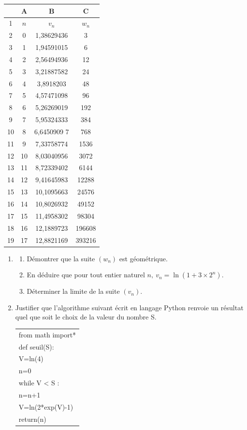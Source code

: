 \begin{minipage}{0.36\linewidth}
{\small\begin{tabular}{c |c|c|c}\hline
	&A &B &C\\ \hline
1 	&$n$&$v_n$& $w_n$\\ \hline
2&0 & 1,38629436 &3\\ \hline
3& 1& 1,94591015 &6\\ \hline
4& 2& 2,56494936 &12\\ \hline
5& 3& 3,21887582 &24\\ \hline
6& 4& 3,8918203 &48\\ \hline
7& 5& 4,57471098 &96\\ \hline
8& 6& 5,26269019 &192\\ \hline
9& 7& 5,95324333 &384\\ \hline
10& 8& 6,6450909 7 &768\\ \hline
11& 9& 7,33758774 &1536\\ \hline
12& 10& 8,03040956 &3072\\ \hline
13& 11& 8,72339402 &6144\\ \hline
14& 12& 9,41645983 &12288\\ \hline
15& 13& 10,1095663 &24576\\ \hline
16& 14& 10,8026932 &49152\\ \hline
17& 15& 11,4958302&98304\\ \hline
18& 16& 12,1889723&196608\\ \hline
19& 17&12,8821169& 393216\\ \hline
\end{tabular}}
\end{minipage}

\begin{enumerate}[start=3]
\item
	\begin{enumerate}
		\item Démontrer que la suite $(w_n)$ est géométrique.
		\item En déduire que pour tout entier naturel $n, \: v_n = \ln \left(1 + 3 \times 2^n\right)$.
		\item Déterminer la limite de la suite $(v_n)$.
	\end{enumerate}
\item Justifier que l'algorithme suivant écrit en langage Python renvoie un résultat quel que soit le choix de la valeur du nombre S.

\begin{center}
\begin{ttfamily}
\begin{tabular}{|l|}\hline
from math import*\\
def seuil(S):\\
\qquad V=ln(4)\\
\qquad n=0\\
\qquad while V < S :\\
\qquad  \quad n=n+1\\
\qquad  \quad V=ln(2*exp(V)-1)\\
\qquad return(n)\\ \hline
\end{tabular}
\end{ttfamily}
\end{center}
\end{enumerate}
